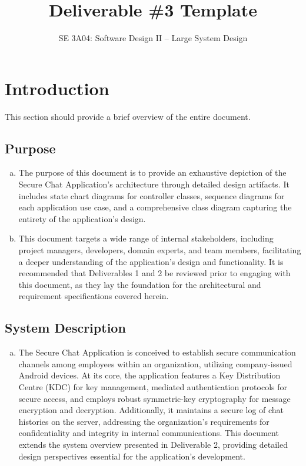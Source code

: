 \documentclass[]{article}
\title{Deliverable \#3 Template}
\author{SE 3A04: Software Design II -- Large System Design}
\date{}
\begin{document}
\maketitle	

\section{Introduction}
\label{sec:introduction}

This section should provide a brief overview of the entire document.

\subsection{Purpose}
\label{sub:purpose}
\begin{enumerate}[a)]
    \item The purpose of this document is to provide an exhaustive depiction of the Secure Chat Application's architecture through detailed design artifacts. It includes state chart diagrams for controller classes, sequence diagrams for each application use case, and a comprehensive class diagram capturing the entirety of the application's design.
    \item This document targets a wide range of internal stakeholders, including project managers, developers, domain experts, and team members, facilitating a deeper understanding of the application's design and functionality. It is recommended that Deliverables 1 and 2 be reviewed prior to engaging with this document, as they lay the foundation for the architectural and requirement specifications covered herein.
\end{enumerate}

\subsection{System Description}
\label{sub:system_description}
\begin{enumerate}[a)]
    \item The Secure Chat Application is conceived to establish secure communication channels among employees within an organization, utilizing company-issued Android devices. At its core, the application features a Key Distribution Centre (KDC) for key management, mediated authentication protocols for secure access, and employs robust symmetric-key cryptography for message encryption and decryption. Additionally, it maintains a secure log of chat histories on the server, addressing the organization's requirements for confidentiality and integrity in internal communications. This document extends the system overview presented in Deliverable 2, providing detailed design perspectives essential for the application's development.
\end{enumerate}
\end{document}
